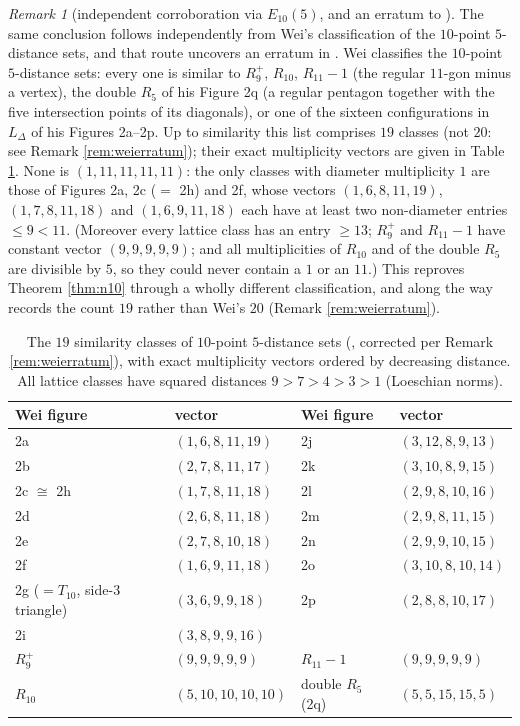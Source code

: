 \documentclass[11pt]{article}
\theoremstyle{definition}
\theoremstyle{remark}
\newtheorem{remark}[theorem]{Remark}
\newcommand{\Lat}{L_{\Delta}}
\begin{document}
\begin{remark}[independent corroboration via $E_{10}(5)$, and an erratum to
{\cite{Wei12}}]\label{rem:n10wei}
The same conclusion follows independently from Wei's classification of the $10$-point
$5$-distance sets, and that route uncovers an erratum in \cite{Wei12}. Wei
\cite[Theorem~11]{Wei12} classifies the $10$-point $5$-distance sets: every one is similar
to $R_9^+$, $R_{10}$, $R_{11}{-}1$ (the regular $11$-gon minus a vertex), the double $R_5$
of his Figure 2q (a regular pentagon together with the five intersection points of its
diagonals), or one of the sixteen configurations in $\Lat$ of his Figures 2a--2p. Up to
similarity this list comprises $19$ classes (not $20$: see Remark \ref{rem:weierratum});
their exact multiplicity vectors are given in Table \ref{tab:e105}. None is
$(1,11,11,11,11)$: the only classes with diameter multiplicity $1$ are those of
Figures 2a, 2c ($=$ 2h) and 2f, whose vectors $(1,6,8,11,19)$, $(1,7,8,11,18)$ and
$(1,6,9,11,18)$ each have at least two non-diameter entries $\le 9 < 11$. (Moreover
every lattice class has an entry $\ge 13$; $R_9^+$ and $R_{11}{-}1$ have constant
vector $(9,9,9,9,9)$; and all multiplicities of $R_{10}$ and of the double $R_5$ are
divisible by $5$, so they could never contain a $1$ or an $11$.) This reproves Theorem
\ref{thm:n10} through a wholly different classification, and along the way records the
count $19$ rather than Wei's $20$ (Remark \ref{rem:weierratum}).
\end{remark}

\begin{table}[ht]
\centering
\caption{The $19$ similarity classes of $10$-point $5$-distance sets
(\cite[Theorem~11]{Wei12}, corrected per Remark \ref{rem:weierratum}), with exact
multiplicity vectors ordered by decreasing distance. All lattice classes have squared
distances $9 > 7 > 4 > 3 > 1$ (Loeschian norms).}
\label{tab:e105}
\begin{tabular}{@{}llll@{}}
\toprule
Wei figure & vector & Wei figure & vector \\
\midrule
2a & $(1,6,8,11,19)$ & 2j & $(3,12,8,9,13)$ \\
2b & $(2,7,8,11,17)$ & 2k & $(3,10,8,9,15)$ \\
2c $\cong$ 2h & $(1,7,8,11,18)$ & 2l & $(2,9,8,10,16)$ \\
2d & $(2,6,8,11,18)$ & 2m & $(2,9,8,11,15)$ \\
2e & $(2,7,8,10,18)$ & 2n & $(2,9,9,10,15)$ \\
2f & $(1,6,9,11,18)$ & 2o & $(3,10,8,10,14)$ \\
2g ($=T_{10}$, side-3 triangle) & $(3,6,9,9,18)$ & 2p & $(2,8,8,10,17)$ \\
2i & $(3,8,9,9,16)$ & & \\
\midrule
$R_9^+$ & $(9,9,9,9,9)$ & $R_{11}{-}1$ & $(9,9,9,9,9)$ \\
$R_{10}$ & $(5,10,10,10,10)$ & double $R_5$ (2q) & $(5,5,15,15,5)$ \\
\bottomrule
\end{tabular}
\end{table}
\end{document}
